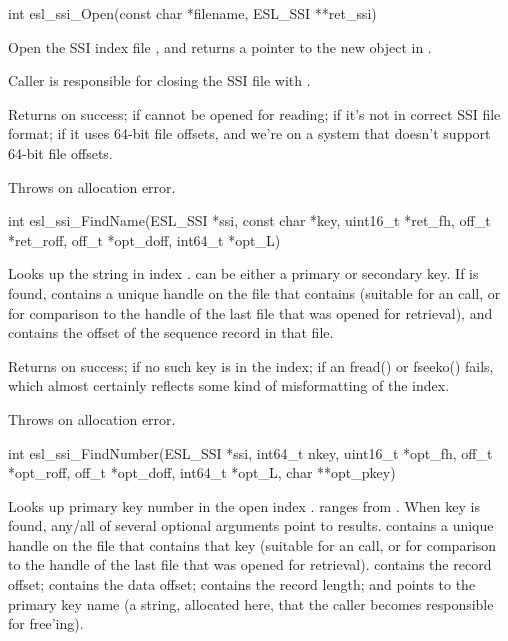 \begin{sreapi}
\hypertarget{func:esl_ssi_Open()}
{\item[int esl\_ssi\_Open(const char *filename, ESL\_SSI **ret\_ssi)]}

Open the SSI index file , and returns a pointer
to the new  object in .

Caller is responsible for closing the SSI file with
.

Returns         on success;
 if  cannot be opened for reading;
   if it's not in correct SSI file format;
    if it uses 64-bit file offsets, and we're on a system
that doesn't support 64-bit file offsets.

Throws  on allocation error.


\hypertarget{func:esl_ssi_FindName()}
{\item[int esl\_ssi\_FindName(ESL\_SSI *ssi, const char *key, uint16\_t *ret\_fh, off\_t *ret\_roff, off\_t *opt\_doff, int64\_t *opt\_L)]}

Looks up the string  in index .
 can be either a primary or secondary key. If 
is found,  contains a unique handle on
the file that contains  (suitable for an 
call, or for comparison to the handle of the last file
that was opened for retrieval), and  contains
the offset of the sequence record in that file.

Returns         on success;
 if no such key is in the index;
   if an fread() or fseeko() fails, which almost
certainly reflects some kind of misformatting of
the index.

Throws       on allocation error.


\hypertarget{func:esl_ssi_FindNumber()}
{\item[int esl\_ssi\_FindNumber(ESL\_SSI *ssi, int64\_t nkey, uint16\_t *opt\_fh, off\_t *opt\_roff, off\_t *opt\_doff, int64\_t *opt\_L, char **opt\_pkey)]}

Looks up primary key number  in the open index
.   ranges from . When
key  is found, any/all of several optional
arguments point to results.  contains a unique
handle on the file that contains that key (suitable for
an  call, or for comparison to the
handle of the last file that was opened for retrieval).
 contains the record offset; 
contains the data offset;  contains the record
length; and  points to the primary key name
(a string, allocated here, that the caller becomes
responsible for free'ing).


\end{sreapi}
